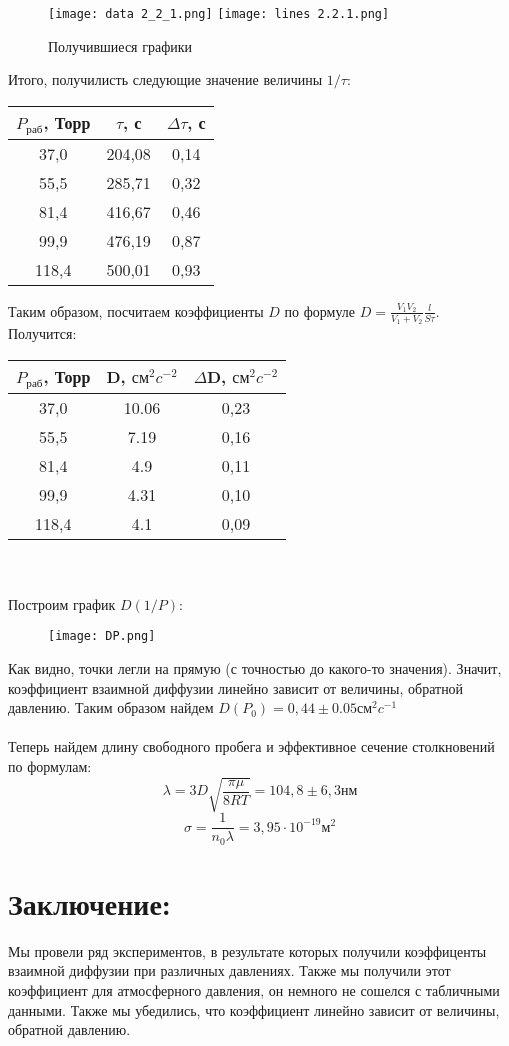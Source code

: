 \documentclass[a4paper, 12pt]{article}
\begin{document}
\begin{figure}[h]
    \centering
    \texttt{[image: data 2\_2\_1.png]}
    \texttt{[image: lines 2.2.1.png]}
    \caption{Получившиеся графики}
\end{figure}
\newpage
Итого, получилисть следующие значение величины \(1/\tau\):
\begin{table}[h]
    \centering
     \begin{tabular}{|c|c|c|}
    \hline
         \(P_{раб}\), Торр & \(\tau\), с & \(\Delta \tau\), с \\
    \hline
         37,0  & 204,08 & 0,14 \\
         55,5  & 285,71 & 0,32 \\
         81,4  & 416,67 & 0,46 \\
         99,9  & 476,19 & 0,87 \\
         118,4 & 500,01 & 0,93 \\
    \hline
    \end{tabular}
\end{table}

Таким образом, посчитаем коэффициенты \(D\) по формуле \(D = \frac{V_1 V_2}{V_1 + V_2}\frac{l}{S\tau}\). Получится:
\begin{table}[h]
    \centering
    \begin{tabular}{|c|c|c|}
    \hline
         \(P_{раб}\), Торр & D, \(см^2c^{-2}\) & \(\Delta\)D, \(см^2c^{-2}\) \\
    \hline
         37,0  & 10.06 & 0,23\\
         55,5  & 7.19  & 0,16 \\
         81,4  & 4.9   & 0,11\\
         99,9  & 4.31  & 0,10\\
         118,4 & 4.1   & 0,09\\
    \hline
    \end{tabular}
\end{table}
\\
\\
Построим график \(D(1/P)\):
\begin{figure}[h]
    \centering
    \texttt{[image: DP.png]}
\end{figure}

Как видно, точки легли на прямую (с точностью до какого-то значения). Значит, коэффициент взаимной диффузии линейно зависит от величины, обратной давлению. Таким образом найдем $D(P_0) = 0,44 \pm 0.05 см^2c^{-1}$
\\
\\

Теперь найдем длину свободного пробега и эффективное сечение столкновений по формулам:
\[\lambda = 3D\sqrt{\frac{\pi \mu}{8RT}} = 104,8 \pm 6,3 нм\]
\[\sigma = \frac{1}{n_0\lambda} = 3,95 \cdot 10^{-19} м^2\]
\section{Заключение:} 
Мы провели ряд экспериментов, в результате которых получили коэффиценты взаимной диффузии при различных давлениях. Также мы получили этот коэффициент для атмосферного давления, он немного не сошелся с табличными данными. Также мы убедились, что коэффициент линейно зависит от величины, обратной давлению.
\end{document}
